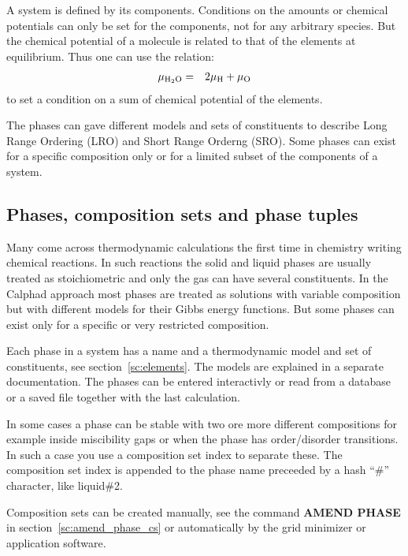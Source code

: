 \documentclass[11pt]{article}
\begin{document}
A system is defined by its components.  Conditions on the amounts or
chemical potentials can only be set for the components, not for any
arbitrary species.  But the chemical potential of a molecule is
related to that of the elements at equilibrium.  Thus one can use the
relation:
\begin{eqnarray}
\mu_{\rm H_2O} &=& 2\mu_{\rm H}+\mu_{\rm O}
\end{eqnarray}
to set a condition on a sum of chemical potential of the elements.

The phases can gave different models and sets of constituents to
describe Long Range Ordering (LRO) and Short Range Orderng (SRO).
Some phases can exist for a specific composition only or for a limited
subset of the components of a system.

\hypertarget{Info phases}{}
\subsection{Phases, composition sets and phase tuples}

Many come across thermodynamic calculations the first time in
chemistry writing chemical reactions.  In such reactions the solid and
liquid phases are usually treated as stoichiometric and only the gas
can have several constituents.  In the Calphad approach most phases
are treated as solutions with variable composition but with different
models for their Gibbs energy functions.  But some phases can exist
only for a specific or very restricted composition.

Each phase in a system has a name and a thermodynamic model and set of
constituents, see section~\ref{sc:elements}.  The models are explained
in a separate documentation.  The phases can be entered interactivly
or read from a database or a saved file together with the last
calculation.

\hypertarget{Info compset}{}

In some cases a phase can be stable with two ore more different
compositions for example inside miscibility gaps or when the phase has
order/disorder transitions.  In such a case you use a composition set
index to separate these.  The composition set index is appended to the
phase name preceeded by a hash ``\#'' character, like liquid\#2.

Composition sets can be created manually, see the command {\bf AMEND
  PHASE} in section~\ref{sc:amend_phase_cs} or automatically by the
grid minimizer or application software.
\end{document}
